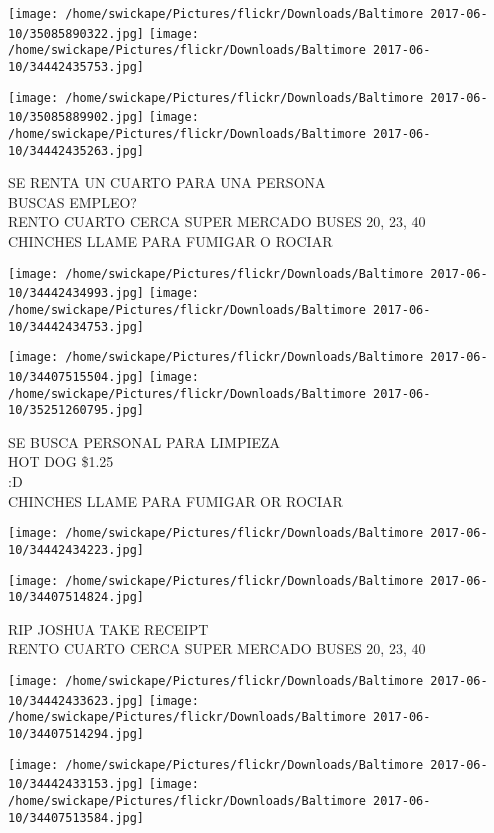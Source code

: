 \documentclass[10pt,letterpaper]{article}
\begin{document}
\texttt{[image: /home/swickape/Pictures/flickr/Downloads/Baltimore 2017-06-10/35085890322.jpg]}
\texttt{[image: /home/swickape/Pictures/flickr/Downloads/Baltimore 2017-06-10/34442435753.jpg]}

\texttt{[image: /home/swickape/Pictures/flickr/Downloads/Baltimore 2017-06-10/35085889902.jpg]}
\texttt{[image: /home/swickape/Pictures/flickr/Downloads/Baltimore 2017-06-10/34442435263.jpg]}

SE RENTA UN CUARTO PARA UNA PERSONA\\
BUSCAS EMPLEO?\\
RENTO CUARTO CERCA SUPER MERCADO BUSES 20, 23, 40\\
CHINCHES LLAME PARA FUMIGAR O ROCIAR\\
\pagebreak

\texttt{[image: /home/swickape/Pictures/flickr/Downloads/Baltimore 2017-06-10/34442434993.jpg]}
\texttt{[image: /home/swickape/Pictures/flickr/Downloads/Baltimore 2017-06-10/34442434753.jpg]}

\texttt{[image: /home/swickape/Pictures/flickr/Downloads/Baltimore 2017-06-10/34407515504.jpg]}
\texttt{[image: /home/swickape/Pictures/flickr/Downloads/Baltimore 2017-06-10/35251260795.jpg]}

SE BUSCA PERSONAL PARA LIMPIEZA\\
HOT DOG \$1.25\\
:D\\
CHINCHES LLAME PARA FUMIGAR OR ROCIAR\\
\pagebreak

\texttt{[image: /home/swickape/Pictures/flickr/Downloads/Baltimore 2017-06-10/34442434223.jpg]}

\vspace{0.25in}
\texttt{[image: /home/swickape/Pictures/flickr/Downloads/Baltimore 2017-06-10/34407514824.jpg]}

RIP JOSHUA TAKE RECEIPT\\
RENTO CUARTO CERCA SUPER MERCADO BUSES 20, 23, 40\\
\pagebreak

\texttt{[image: /home/swickape/Pictures/flickr/Downloads/Baltimore 2017-06-10/34442433623.jpg]}
\texttt{[image: /home/swickape/Pictures/flickr/Downloads/Baltimore 2017-06-10/34407514294.jpg]}

\texttt{[image: /home/swickape/Pictures/flickr/Downloads/Baltimore 2017-06-10/34442433153.jpg]}
\texttt{[image: /home/swickape/Pictures/flickr/Downloads/Baltimore 2017-06-10/34407513584.jpg]}
\end{document}
